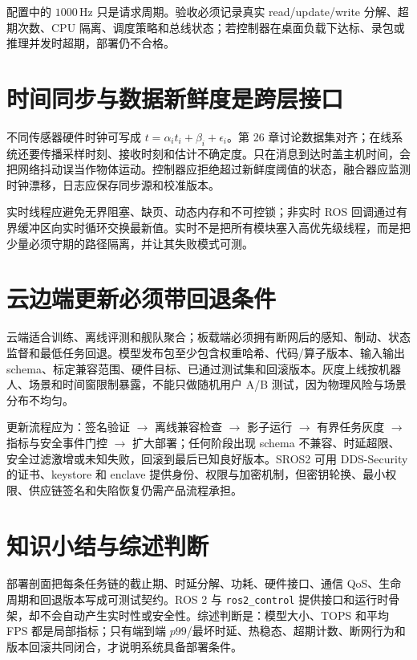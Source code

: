配置中的 $1000\,\mathrm{Hz}$ 只是请求周期。验收必须记录真实 read/update/write 分解、超期次数、CPU 隔离、调度策略和总线状态；若控制器在桌面负载下达标、录包或推理并发时超期，部署仍不合格。

\section{时间同步与数据新鲜度是跨层接口}

不同传感器硬件时钟可写成 $t=\alpha_i t_i+\beta_i+\epsilon_i$。第 26 章讨论数据集对齐；在线系统还要传播采样时刻、接收时刻和估计不确定度。只在消息到达时盖主机时间，会把网络抖动误当作物体运动。控制器应拒绝超过新鲜度阈值的状态，融合器应监测时钟漂移，日志应保存同步源和校准版本。

实时线程应避免无界阻塞、缺页、动态内存和不可控锁；非实时 ROS 回调通过有界缓冲区向实时循环交换最新值。实时不是把所有模块塞入高优先级线程，而是把少量必须守期的路径隔离，并让其失败模式可测。

\section{云边端更新必须带回退条件}

云端适合训练、离线评测和舰队聚合；板载端必须拥有断网后的感知、制动、状态监督和最低任务回退。模型发布包至少包含权重哈希、代码/算子版本、输入输出 schema、标定兼容范围、硬件目标、已通过测试集和回滚版本。灰度上线按机器人、场景和时间窗限制暴露，不能只做随机用户 A/B 测试，因为物理风险与场景分布不均匀。

更新流程应为：签名验证 $\rightarrow$ 离线兼容检查 $\rightarrow$ 影子运行 $\rightarrow$ 有界任务灰度 $\rightarrow$ 指标与安全事件门控 $\rightarrow$ 扩大部署；任何阶段出现 schema 不兼容、时延超限、安全过滤激增或未知失败，回滚到最后已知良好版本。SROS2 可用 DDS-Security 的证书、keystore 和 enclave 提供身份、权限与加密机制\cite{ros2security2026}，但密钥轮换、最小权限、供应链签名和失陷恢复仍需产品流程承担。

\section{知识小结与综述判断}

部署剖面把每条任务链的截止期、时延分解、功耗、硬件接口、通信 QoS、生命周期和回退版本写成可测试契约。ROS 2 与 \texttt{ros2\_control} 提供接口和运行时骨架，却不会自动产生实时性或安全性。综述判断是：模型大小、TOPS 和平均 FPS 都是局部指标；只有端到端 $p99$/最坏时延、热稳态、超期计数、断网行为和版本回滚共同闭合，才说明系统具备部署条件。

